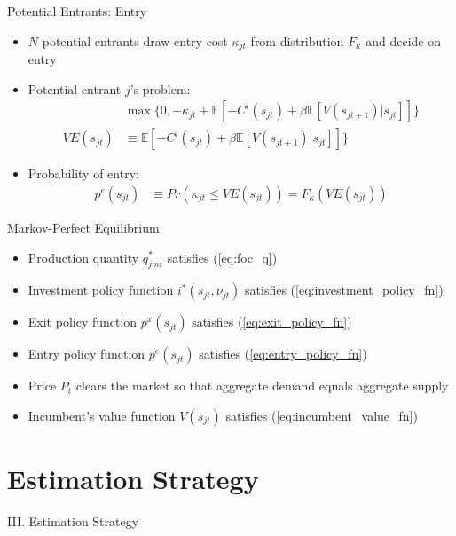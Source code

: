 \documentclass[xcolor=dvipsnames,envcountsect]{beamer}
\begin{document}
\begin{frame}{Potential Entrants: Entry}
\begin{itemize}
    \item $\bar N$ potential entrants draw entry cost $\kappa_{jt}$ from distribution $F_\kappa$ and decide on entry
    \item Potential entrant $j$'s problem:
    \begin{align}
       & \max\{0,-\kappa_{jt}+\mathbb{E}[-C^i(s_{jt})+\beta \mathbb{E}[V(s_{jt+1})|s_{jt}]]\} \\
       VE(s_{jt}) & \equiv \mathbb{E}[-C^i(s_{jt})+\beta \mathbb{E}[V(s_{jt+1})|s_{jt}]]\} \nonumber
    \end{align}

    \item Probability of entry:
    \begin{align}
        p^e(s_{jt}) & \equiv Pr(\kappa_{jt}\leq VE(s_{jt})) = F_\kappa(VE(s_{jt})) \label{eq:entry_policy_fn}
    \end{align}

\end{itemize}
\end{frame}

\begin{frame}{Markov-Perfect Equilibrium}
\begin{itemize}
    \item Production quantity $q_{jmt}^*$ satisfies (\ref{eq:foc_q})
    \item Investment policy function $i^*(s_{jt},\nu_{jt})$ satisfies (\ref{eq:investment_policy_fn})
    \item Exit policy function $p^x(s_{jt})$ satisfies (\ref{eq:exit_policy_fn})
    \item Entry policy function $p^e(s_{jt})$ satisfies (\ref{eq:entry_policy_fn})
    \item Price $P_t$ clears the market so that aggregate demand equals aggregate supply
    \item Incumbent's value function $V(s_{jt})$ satisfies (\ref{eq:incumbent_value_fn})
\end{itemize}
\end{frame}


\section{Estimation Strategy}
\begin{frame}
\begin{center} 
{\color{sbured}\LARGE III. Estimation Strategy}
\end{center}
\end{frame}
\end{document}
